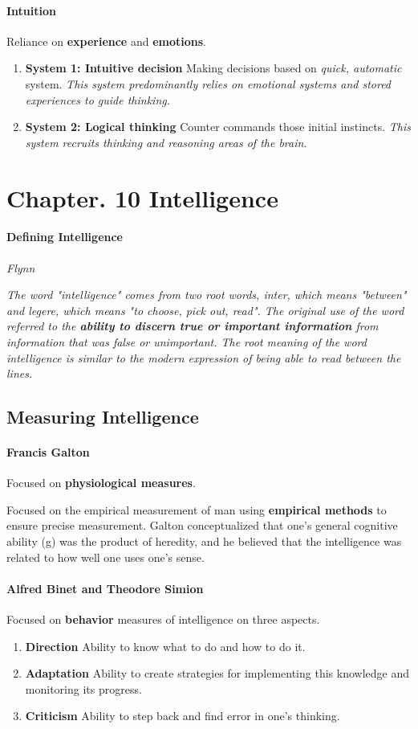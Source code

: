\documentclass{article}
\begin{document}
	\paragraph{Intuition} Reliance on \textbf{experience} and \textbf{emotions}.

	\begin{enumerate}
		\item \textbf{System 1: Intuitive decision} Making decisions based on \emph{quick, automatic} system. \emph{This system predominantly relies on emotional systems and stored experiences to guide thinking.}
		\item \textbf{System 2: Logical thinking} Counter commands those initial instincts. \emph{This system recruits thinking and reasoning areas of the brain}.
	\end{enumerate}

	\section{Chapter. 10 Intelligence}
	\paragraph{Defining Intelligence} \emph{Flynn}
	
	\emph{The word "intelligence" comes from two root words, inter, which means "between" and legere, which means "to choose, pick out, read". The original use of the word referred to the \textbf{ability to discern true or important information} from information that was false or unimportant. The root meaning of the word intelligence is similar to the modern expression of being able to read between the lines.}
	\subsection{Measuring Intelligence}

	\paragraph{Francis Galton} Focused on \textbf{physiological measures}.
	
	Focused on the empirical measurement of man using \textbf{empirical methods} to ensure precise measurement. Galton conceptualized that one's general cognitive ability (g) was the product of heredity, and he believed that the intelligence was related to how well one uses one's sense.
	\paragraph{Alfred Binet and Theodore Simion} Focused on \textbf{behavior} measures of intelligence on three aspects.
	\begin{enumerate}
		\item \textbf{Direction} Ability to know what to do and how to do it.
		\item \textbf{Adaptation} Ability to create strategies for implementing this knowledge and monitoring its progress.
		\item \textbf{Criticism} Ability to step back and find error in one's thinking.
	\end{enumerate}
\end{document}

